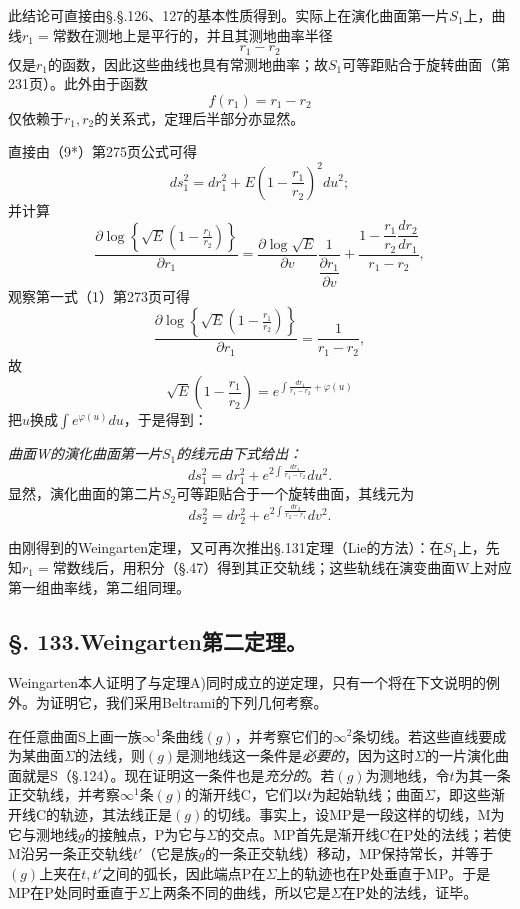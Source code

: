 此结论可直接由\S.\S.126、127的基本性质得到。实际上在演化曲面第一片\(S_1\)上，曲线\(r_1=\)常数在测地上是平行的，并且其测地曲率半径
\[
 r_1-r_2
\]
仅是\(r_1\)的函数，因此这些曲线也具有常测地曲率；故\(S_1\)可等距贴合于旋转曲面（第231页）。此外由于函数
\[
 f(r_1)=r_1-r_2
\]
仅依赖于\(r_1,r_2\)的关系式，定理后半部分亦显然。

直接由（9*）第275页公式可得
\[
 ds_1^2=dr_1^2+E\left(1-\frac{r_1}{r_2}\right)^2du^2;
\]
并计算
\[
 \frac{\partial\log\left\{\sqrt E\left(1-\frac{r_1}{r_2}\right)\right\}}{\partial r_1}
 =\frac{\partial\log\sqrt E}{\partial v}\frac1{\dfrac{\partial r_1}{\partial v}}+\frac{1-\dfrac{r_1}{r_2}\dfrac{dr_2}{dr_1}}{r_1-r_2},
\]
观察第一式（1）第273页可得
\[
 \frac{\partial\log\left\{\sqrt E\left(1-\frac{r_1}{r_2}\right)\right\}}{\partial r_1}=\frac1{r_1-r_2},
\]
故
\[
 \sqrt E\left(1-\frac{r_1}{r_2}\right)=e^{\int\frac{dr_1}{r_1-r_2}+\varphi(u)}
\]
把\(u\)换成\(\int e^{\varphi(u)}du\)，于是得到：

\emph{曲面W的演化曲面第一片\(S_1\)的线元由下式给出：}
\begin{equation}\tag{19}
 ds_1^2=dr_1^2+e^{2\int\frac{dr_1}{r_1-r_2}}du^2.
\end{equation}
显然，演化曲面的第二片\(S_2\)可等距贴合于一个旋转曲面，其线元为
\begin{equation}\tag{19*}
 ds_2^2=dr_2^2+e^{2\int\frac{dr_2}{r_2-r_1}}dv^2.
\end{equation}

由刚得到的Weingarten定理，又可再次推出\S.131定理（Lie的方法）：在\(S_1\)上，先知\(r_1=\)常数线后，用积分（\S.47）得到其正交轨线；这些轨线在演变曲面W上对应第一组曲率线，第二组同理。

\subsection*{\S. 133.\quad Weingarten第二定理。}

Weingarten本人证明了与定理A)同时成立的逆定理，只有一个将在下文说明的例外。为证明它，我们采用Beltrami的下列几何考察。

在任意曲面S上画一族\(\infty^1\)条曲线\((g)\)，并考察它们的\(\infty^2\)条切线。若这些直线要成为某曲面\(\Sigma\)的法线，则\((g)\)是测地线这一条件是\emph{必要的}，因为这时\(\Sigma\)的一片演化曲面就是S（\S.124）。现在证明这一条件也是\emph{充分的}。若\((g)\)为测地线，令\(t\)为其一条正交轨线，并考察\(\infty^1\)条\((g)\)的渐开线C，它们以\(t\)为起始轨线；曲面\(\Sigma\)，即这些渐开线C的轨迹，其法线正是\((g)\)的切线。事实上，设MP是一段这样的切线，M为它与测地线\(g\)的接触点，P为它与\(\Sigma\)的交点。MP首先是渐开线C在P处的法线；若使M沿另一条正交轨线\(t'\)（它是族\(g\)的一条正交轨线）移动，MP保持常长，并等于\((g)\)上夹在\(t,t'\)之间的弧长，因此端点P在\(\Sigma\)上的轨迹也在P处垂直于MP。于是MP在P处同时垂直于\(\Sigma\)上两条不同的曲线，所以它是\(\Sigma\)在P处的法线，证毕。

